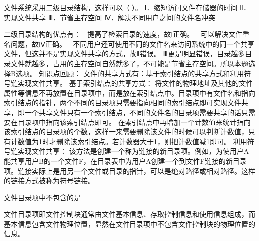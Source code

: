 \question 文件系统采用二级目录结构，这样可以（ ）。 Ⅰ．缩短访问文件存储器的时间
Ⅱ．实现文件共享 Ⅲ．节省主存空间 Ⅳ．解决不同用户之间的文件名冲突
\par{}
\begin{solution}二级目录结构的优点有：  提高了检索目录的速度，故Ⅰ正确。 
可以解决文件重名问题，故Ⅳ正确。 
不同用户还可使用不同的文件名来访问系统中的同一个共享文件，但这并不是实现文件共享的方式，故Ⅱ错误。
Ⅲ更是明显错误，目录越多目录文件就越多，占用的主存空间自然就多了，不可能是节省主存空间。所以本题选择B选项。
知识点回顾：
文件的共享方式有：基于索引结点的共享方式和利用符号链实现文件共享。
基于索引结点的共享方式：
将文件的物理地址及其他的文件属性等信息不再放置在目录项中，而是放在索引结点中。目录项中有文件名和指向索引结点的指针，两个不同的目录项只需要指向相同的索引结点即可实现文件共享，即一个共享文件只有一个索引结点，不同的文件名的目录项需要共享的话只需要在目录项中指向该索引结点即可。
在索引结点中再增加一个计数值来统计指向该索引结点的目录项的个数，这样一来需要删除该文件的时候可以判断计数值，只有计数值为1时才删除该索引结点。若计数器大于1，则把计数值减1即可。
利用符号链实现文件共享：
该方法是创建一个称为链接的新目录项。例如，为使用户A能共享用户B的一个文件F，在目录表中为用户A创建一个到文件F链接的新目录项。链接实际上是用另一个文件或目录的指针，可以是绝对路径或相对路径。这样的链接方式被称为符号链接。
\end{solution}
\question 文件目录项中不包含的是
\par{}
\begin{solution}文件目录项即文件控制块通常由文件基本信息、存取控制信息和使用信息组成，而基本信息包含文件物理位置，显然在文件目录项中不包含文件控制块的物理位置的信息。
\end{solution}

